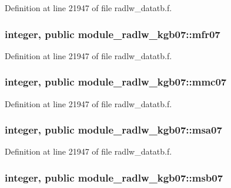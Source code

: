Definition at line 21947 of file radlw\+\_\+datatb.\+f.

\subsubsection[{\texorpdfstring{mfr07}{mfr07}}]{\setlength{\rightskip}{0pt plus 5cm}integer, public module\+\_\+radlw\+\_\+kgb07\+::mfr07}\hypertarget{namespacemodule__radlw__kgb07_a0bd5d550553238ae13cbf57423d102c8}{}\label{namespacemodule__radlw__kgb07_a0bd5d550553238ae13cbf57423d102c8}


Definition at line 21947 of file radlw\+\_\+datatb.\+f.

\subsubsection[{\texorpdfstring{mmc07}{mmc07}}]{\setlength{\rightskip}{0pt plus 5cm}integer, public module\+\_\+radlw\+\_\+kgb07\+::mmc07}\hypertarget{namespacemodule__radlw__kgb07_a2d176bec938d9fdcc2369fda91308702}{}\label{namespacemodule__radlw__kgb07_a2d176bec938d9fdcc2369fda91308702}


Definition at line 21947 of file radlw\+\_\+datatb.\+f.

\subsubsection[{\texorpdfstring{msa07}{msa07}}]{\setlength{\rightskip}{0pt plus 5cm}integer, public module\+\_\+radlw\+\_\+kgb07\+::msa07}\hypertarget{namespacemodule__radlw__kgb07_a0acb84a6b261fc00f1765707844c32f2}{}\label{namespacemodule__radlw__kgb07_a0acb84a6b261fc00f1765707844c32f2}


Definition at line 21947 of file radlw\+\_\+datatb.\+f.

\subsubsection[{\texorpdfstring{msb07}{msb07}}]{\setlength{\rightskip}{0pt plus 5cm}integer, public module\+\_\+radlw\+\_\+kgb07\+::msb07}\hypertarget{namespacemodule__radlw__kgb07_abba2139dfc5d8551f844f3809c28ce3c}{}\label{namespacemodule__radlw__kgb07_abba2139dfc5d8551f844f3809c28ce3c}



